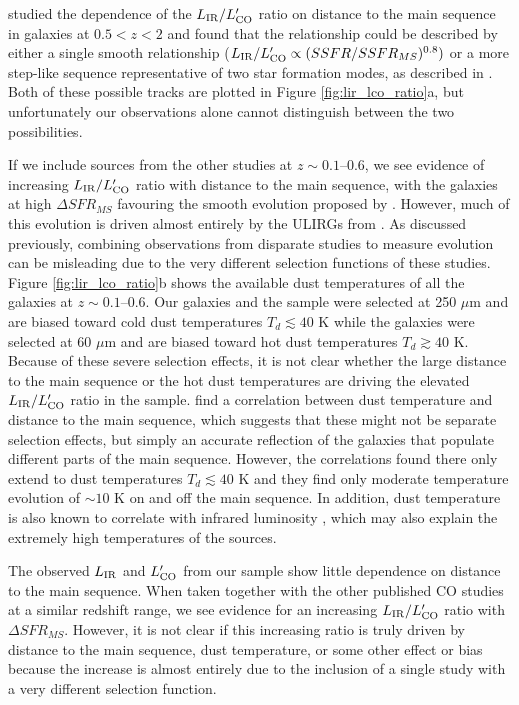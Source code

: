 \documentclass[a4paper,fleqn,usenatbib]{mnras}
\newcommand{\lir}{L_{\rm{IR}}}
\newcommand{\lco}{L'_{\rm{CO}}}
\begin{document}
\citet{2012ApJ...760....6M} studied the dependence of the $\lir / \lco$ ratio on distance to the main sequence in galaxies at $0.5 < z < 2$ and found that the relationship could be described by either a single smooth relationship ($\lir / \lco \propto (SSFR/SSFR_{MS})^{0.8})$ or a more step-like sequence representative of two star formation modes, as described in \citet{2014ApJ...793...19S}. Both of these possible tracks are plotted in Figure \ref{fig:lir_lco_ratio}a, but unfortunately our observations alone cannot distinguish between the two possibilities.

If we include sources from the other studies at $z \sim 0.1$--0.6, we see evidence of increasing $\lir / \lco$ ratio with distance to the main sequence, with the galaxies at high $\Delta SFR_{MS}$ favouring the smooth evolution proposed by \citet{2014ApJ...793...19S}. However, much of this evolution is driven almost entirely by the ULIRGs from \citet[][in blue]{2011A&A...528A.124C}. As discussed previously, combining observations from disparate studies to measure evolution can be misleading due to the very different selection functions of these studies. Figure \ref{fig:lir_lco_ratio}b shows the available dust temperatures of all the galaxies at $z \sim 0.1$--0.6. Our galaxies and the \citet{2012ApJ...760....6M} sample were selected at 250 $\mu$m and are biased toward cold dust temperatures $T_{d} \lesssim 40$ K while the \citet{2011A&A...528A.124C} galaxies were selected at 60 $\mu$m and are biased toward hot dust temperatures $T_{d} \gtrsim 40$ K. Because of these severe selection effects, it is not clear whether the large distance to the main sequence or the hot dust temperatures are driving the elevated $\lir / \lco$ ratio in the \citet{2011A&A...528A.124C} sample. \citet{2014A&A...561A..86M} find a correlation between dust temperature and distance to the main sequence, which suggests that these might not be separate selection effects, but simply an accurate reflection of the galaxies that populate different parts of the main sequence. However, the correlations found there only extend to dust temperatures $T_{d} \lesssim 40$ K and they find only moderate temperature evolution of $\sim 10$ K on and off the main sequence. In addition, dust temperature is also known to correlate with infrared luminosity \citep[e.g.][]{2013ApJ...778..131L}, which may also explain the extremely high temperatures of the \citet{2011A&A...528A.124C} sources. 

\vspace{0.5em}
The observed $\lir$ and $\lco$ from our sample show little dependence on distance to the main sequence. When taken together with the other published CO studies at a similar redshift range, we see evidence for an increasing $\lir / \lco$ ratio with $\Delta SFR_{MS}$. However, it is not clear if this increasing ratio is truly driven by distance to the main sequence, dust temperature, or some other effect or bias because the increase is almost entirely due to the inclusion of a single study with a very different selection function. 
\end{document}
